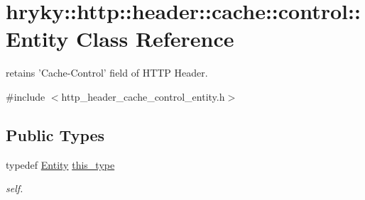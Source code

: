 \hypertarget{classhryky_1_1http_1_1header_1_1cache_1_1control_1_1_entity}{\section{hryky\-:\-:http\-:\-:header\-:\-:cache\-:\-:control\-:\-:Entity Class Reference}
\label{classhryky_1_1http_1_1header_1_1cache_1_1control_1_1_entity}
}


retains 'Cache-\/\-Control' field of H\-T\-T\-P Header.  




{\ttfamily \#include $<$http\-\_\-header\-\_\-cache\-\_\-control\-\_\-entity.\-h$>$}

\subsection*{Public Types}
\begin{DoxyCompactItemize}
\item 
\hypertarget{classhryky_1_1http_1_1header_1_1cache_1_1control_1_1_entity_aa2d258ee93a9cca251a8cfe0b9ed3f4d}{typedef \hyperlink{classhryky_1_1http_1_1header_1_1cache_1_1control_1_1_entity}{Entity} \hyperlink{classhryky_1_1http_1_1header_1_1cache_1_1control_1_1_entity_aa2d258ee93a9cca251a8cfe0b9ed3f4d}{this\-\_\-type}}\label{classhryky_1_1http_1_1header_1_1cache_1_1control_1_1_entity_aa2d258ee93a9cca251a8cfe0b9ed3f4d}

\begin{DoxyCompactList}\small\item\em self. \end{DoxyCompactList}\end{DoxyCompactItemize}
